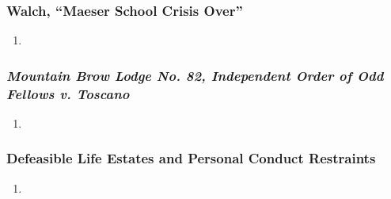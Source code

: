 \subsubsection{Walch, ``Maeser School Crisis Over''}

\begin{enumerate}
    \item %
\end{enumerate}

\subsubsection{\emph{Mountain Brow Lodge No. 82, Independent Order of Odd 
Fellows v. Toscano}}

\begin{enumerate}
    \item %
\end{enumerate}

\subsubsection{Defeasible Life Estates and Personal Conduct Restraints}

\begin{enumerate}
    \item %
\end{enumerate}
